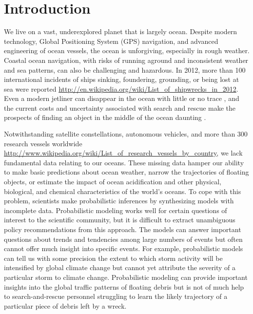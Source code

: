 \section{Introduction}

We live on a vast, underexplored planet that is largely ocean. Despite modern technology, Global Positioning System (GPS) navigation, and advanced engineering of ocean vessels, the ocean is unforgiving, especially in rough weather. Coastal ocean navigation, with risks of running aground and inconsistent weather and sea patterns, can also be challenging and hazardous. In 2012, more than 100 international incidents of ships sinking, foundering, grounding, or being lost at sea were reported \url{http://en.wikipedia.org/wiki/List_of_shipwrecks_in_2012}. Even a modern jetliner can disappear in the ocean with little or no trace \cite{mcnutt_hunt_2014}, and the current costs and uncertainty associated with search and rescue make the prospects of finding an object in the middle of the ocean daunting \cite{allen_us_2010}.

Notwithstanding satellite constellations, autonomous vehicles, and more than 300 research vessels worldwide \url{http://www.wikipedia.org/wiki/List_of_research_vessels_by_country}, we lack fundamental data relating to our oceans. These missing data hamper our ability to make basic predictions about ocean weather, narrow the trajectories of floating objects, or estimate the impact of ocean acidification and other physical, biological, and chemical characteristics of the world's oceans. To cope with this problem, scientists make probabilistic inferences by synthesizing models with incomplete data. Probabilistic modeling works well for certain questions of interest to the scientific community, but it is difficult to extract unambiguous policy recommendations from this approach. The models can answer important questions about trends and tendencies among large numbers of events but often cannot offer much insight into specific events. For example, probabilistic models can tell us with some precision the extent to which storm activity will be intensified by global climate change but cannot yet attribute the severity of a particular storm to climate change. Probabilistic modeling can provide important insights into the global traffic patterns of floating debris but is not of much help to search-and-rescue personnel struggling to learn the likely trajectory of a particular piece of debris left by a wreck.


